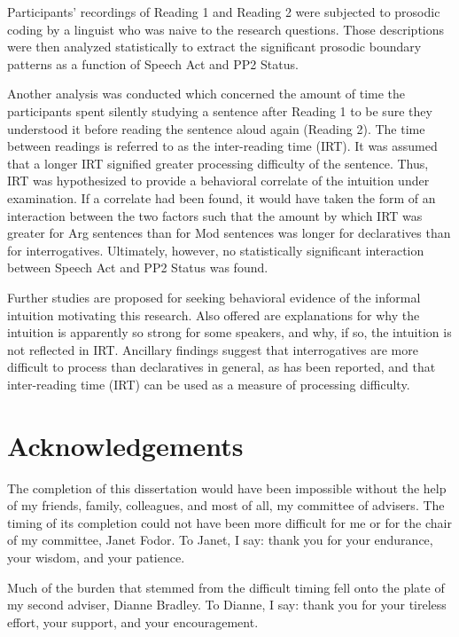 \documentclass[12pt,oneside]{book}
\begin{document}
Participants' recordings of Reading 1 and Reading 2 were subjected to prosodic coding by a linguist who was naive to the research questions. Those descriptions were then analyzed statistically to extract the significant prosodic boundary patterns as a function of Speech Act and PP2 Status.

Another analysis was conducted which concerned the amount of time the participants spent silently studying a sentence after Reading 1 to be sure they understood it before reading the sentence aloud again (Reading 2). The time between readings is referred to as the inter-reading time (IRT). It was assumed that a longer IRT signified greater processing difficulty of the sentence. Thus, IRT was hypothesized to provide a behavioral correlate of the intuition under examination. If a correlate had been found, it would have taken the form of an interaction between the two factors such that the amount by which IRT was greater for Arg sentences than for Mod sentences was longer for declaratives than for interrogatives. Ultimately, however, no statistically significant interaction between Speech Act and PP2 Status was found.

Further studies are proposed for seeking behavioral evidence of the informal intuition motivating this research. Also offered are explanations for why the intuition is apparently so strong for some speakers, and why, if so, the intuition is not reflected in IRT. Ancillary findings suggest that interrogatives are more difficult to process than declaratives in general, as has been reported, and that inter-reading time (IRT) can be used as a measure of processing difficulty.

\hypertarget{acknowledgements}{%
\chapter*{Acknowledgements}\label{acknowledgements}}

The completion of this dissertation would have been impossible without the help of my friends, family, colleagues, and most of all, my committee of advisers. The timing of its completion could not have been more difficult for me or for the chair of my committee, Janet Fodor. To Janet, I say: thank you for your endurance, your wisdom, and your patience.

Much of the burden that stemmed from the difficult timing fell onto the plate of my second adviser, Dianne Bradley. To Dianne, I say: thank you for your tireless effort, your support, and your encouragement.
\end{document}
